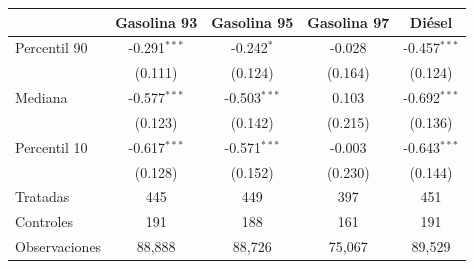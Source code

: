 \begin{tabular}{lcccc}
\toprule
 & Gasolina 93 & Gasolina 95 & Gasolina 97 & Diésel \\
\midrule
Percentil 90 & -0.291$^{***}$ & -0.242$^{*}$ & -0.028 & -0.457$^{***}$ \\
 & (0.111) & (0.124) & (0.164) & (0.124) \\
Mediana & -0.577$^{***}$ & -0.503$^{***}$ & 0.103 & -0.692$^{***}$ \\
 & (0.123) & (0.142) & (0.215) & (0.136) \\
Percentil 10 & -0.617$^{***}$ & -0.571$^{***}$ & -0.003 & -0.643$^{***}$ \\
 & (0.128) & (0.152) & (0.230) & (0.144) \\
\midrule
Tratadas & 445 & 449 & 397 & 451 \\
Controles & 191 & 188 & 161 & 191 \\
Observaciones & 88,888 & 88,726 & 75,067 & 89,529 \\
\bottomrule
\end{tabular}
